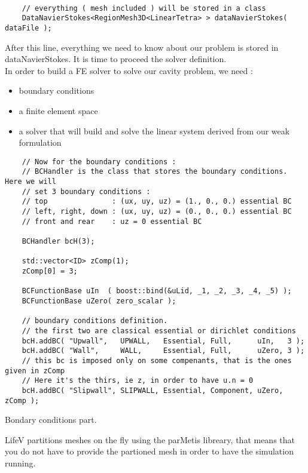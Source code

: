 \begin{verbatim}

    // everything ( mesh included ) will be stored in a class
    DataNavierStokes<RegionMesh3D<LinearTetra> > dataNavierStokes( dataFile );

\end{verbatim}

\noident After this line, everything we need to know about our problem is stored
in dataNavierStokes. It is time to proceed the solver definition. \\
In order to build a FE solver to solve our cavity problem, we need :
\begin{itemize}
\item boundary conditions
\item a finite element space
\item a solver that will build and solve the linear system derived from our weak formulation
\end{itemize}


\begin{verbatim}
    // Now for the boundary conditions :
    // BCHandler is the class that stores the boundary conditions. Here we will
    // set 3 boundary conditions :
    // top               : (ux, uy, uz) = (1., 0., 0.) essential BC
    // left, right, down : (ux, uy, uz) = (0., 0., 0.) essential BC
    // front and rear    : uz = 0 essential BC

    BCHandler bcH(3);

    std::vector<ID> zComp(1);
    zComp[0] = 3;

    BCFunctionBase uIn  ( boost::bind(&uLid, _1, _2, _3, _4, _5) );
    BCFunctionBase uZero( zero_scalar );

    // boundary conditions definition.
    // the first two are classical essential or dirichlet conditions
    bcH.addBC( "Upwall",   UPWALL,   Essential, Full,      uIn,   3 );
    bcH.addBC( "Wall",     WALL,     Essential, Full,      uZero, 3 );
    // this bc is imposed only on some compenants, that is the ones given in zComp
    // Here it's the thirs, ie z, in order to have u.n = 0
    bcH.addBC( "Slipwall", SLIPWALL, Essential, Component, uZero, zComp );
\end{verbatim}

Bondary conditions part.

LifeV partitions meshes on the fly using the parMetis libreary, that means that you do not have to provide the
partioned mesh in order to have the simulation running.

